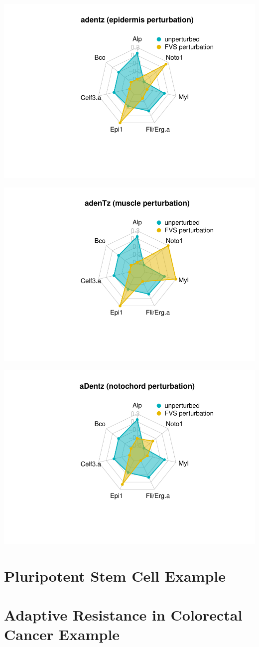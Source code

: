 \documentclass[
]{book}
\theoremstyle{definition}
\theoremstyle{definition}
\theoremstyle{definition}
\theoremstyle{definition}
\theoremstyle{remark}
\begin{document}
\begin{center}\includegraphics[width=0.5\linewidth]{_main_files/figure-latex/unnamed-chunk-21-5} \end{center}

\begin{center}\includegraphics[width=0.5\linewidth]{_main_files/figure-latex/unnamed-chunk-21-6} \end{center}

\begin{center}\includegraphics[width=0.5\linewidth]{_main_files/figure-latex/unnamed-chunk-21-7} \end{center}

\hypertarget{pluripotent-stem-cell-example}{%
\chapter{Pluripotent Stem Cell Example}\label{pluripotent-stem-cell-example}}

\hypertarget{adaptive-resistance-in-colorectal-cancer-example}{%
\chapter{Adaptive Resistance in Colorectal Cancer Example}\label{adaptive-resistance-in-colorectal-cancer-example}}
\end{document}
